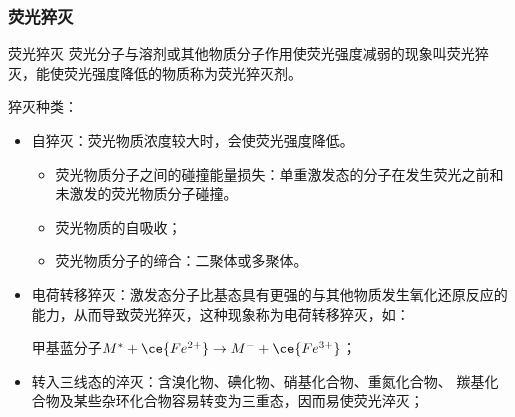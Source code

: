 \subsubsection{荧光猝灭}
\begin{definition*}{荧光猝灭}
	荧光分子与溶剂或其他物质分子作用使荧光强度减弱的现象叫荧光猝灭，能使荧光强度降低的物质称为荧光猝灭剂。
\end{definition*}
猝灭种类：
\begin{itemize}
	\item 自猝灭：荧光物质浓度较大时，会使荧光强度降低。
	\begin{itemize}
		\item 荧光物质分子之间的碰撞能量损失：单重激发态的分子在发生荧光之前和未激发的荧光物质分子碰撞。
		\item 荧光物质的自吸收；
		\item 荧光物质分子的缔合：二聚体或多聚体。
	\end{itemize}
	\item 电荷转移猝灭：激发态分子比基态具有更强的与其他物质发生氧化还原反应的能力，从而导致荧光猝灭，这种现象称为电荷转移猝灭，如：
	
	甲基蓝分子$M^*+\ce{Fe^{2+}} \rightarrow M^{-}+\ce{Fe^{3+}}$；
	\item 转入三线态的淬灭：含溴化物、碘化物、硝基化合物、重氮化合物、 羰基化合物及某些杂环化合物容易转变为三重态，因而易使荧光淬灭；
\end{itemize}

